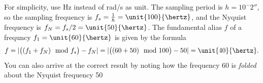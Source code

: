 \documentclass[letterpaper,12pt]{scrartcl}
\newenvironment{exercise}[1][Problem]{\begin{trivlist} \item[\hskip
    \labelsep {\stepcounter{exerctr}\bfseries #1
      \arabic{exerctr}}]}{\end{trivlist}\vspace{10mm}}
\newcounter{exerctr}
\begin{document}
\begin{exercise}
  For simplicity,  use Hz instead of rad/s as unit. The sampling period is $h=\unit{10^-2}{\second}$, so the sampling frequency is $f_s = \frac{1}{h} = \unit{100}{\hertz}$, and the Nyquist frequency is $f_N=f_s/2 = \unit{50}{\hertz}$. The fundamental alias $f$ of a frequncy $f_1=\unit{60}{\hertz}$ is given by the formula
  \[ f = | \big( (f_1 + f_N) \mod f_s \big) - f_N | = | \big( (60 + 50) \mod 100 \big) - 50 | = \unit{40}{\hertz}.\]
  You can also arrive at the correct result by noting how the frequency \unit{60}{\hertz} is \emph{folded} about the Nyquist frequency \unit{50}{\hertz}
  \begin{center}
  \end{center}
\end{exercise}
\end{document}

